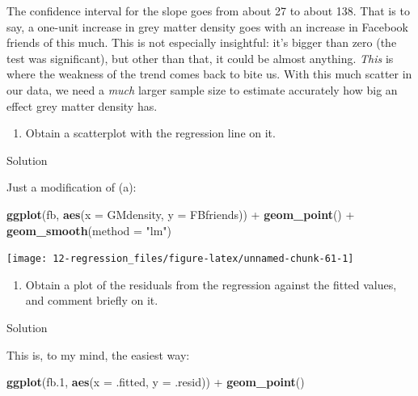 \documentclass[]{tufte-book}
\newenvironment{Shaded}{}{}
\newcommand{\DataTypeTok}[1]{\textcolor[rgb]{0.56,0.13,0.00}{#1}}
\newcommand{\FloatTok}[1]{\textcolor[rgb]{0.25,0.63,0.44}{#1}}
\newcommand{\KeywordTok}[1]{\textcolor[rgb]{0.00,0.44,0.13}{\textbf{#1}}}
\newcommand{\NormalTok}[1]{#1}
\newcommand{\OperatorTok}[1]{\textcolor[rgb]{0.40,0.40,0.40}{#1}}
\newcommand{\StringTok}[1]{\textcolor[rgb]{0.25,0.44,0.63}{#1}}
\providecommand{\tightlist}{%
  \setlength{\itemsep}{0pt}\setlength{\parskip}{0pt}}
\theoremstyle{definition}
\theoremstyle{definition}
\theoremstyle{definition}
\theoremstyle{remark}
\begin{document}
The confidence interval for the slope goes from about 27 to about 138.
That is to say, a one-unit increase in grey matter density goes with an
increase in Facebook friends of this much. This is not especially
insightful: it's bigger than zero (the test was significant), but other
than that, it could be almost anything. \emph{This} is where the
weakness of the trend comes back to bite us. With this much scatter in
our data, we need a \emph{much} larger sample size to estimate
accurately how big an effect grey matter density has.

\begin{enumerate}
\def\labelenumi{(\alph{enumi})}
\setcounter{enumi}{5}
\tightlist
\item
  Obtain a scatterplot with the regression line on it.
\end{enumerate}

Solution

Just a modification of (a):

\begin{Shaded}
\begin{Highlighting}[]
\KeywordTok{ggplot}\NormalTok{(fb, }\KeywordTok{aes}\NormalTok{(}\DataTypeTok{x =}\NormalTok{ GMdensity, }\DataTypeTok{y =}\NormalTok{ FBfriends)) }\OperatorTok{+}\StringTok{ }
\StringTok{    }\KeywordTok{geom_point}\NormalTok{() }\OperatorTok{+}\StringTok{ }\KeywordTok{geom_smooth}\NormalTok{(}\DataTypeTok{method =} \StringTok{"lm"}\NormalTok{)}
\end{Highlighting}
\end{Shaded}

\texttt{[image: 12-regression\_files/figure-latex/unnamed-chunk-61-1]}

\begin{enumerate}
\def\labelenumi{(\alph{enumi})}
\setcounter{enumi}{6}
\tightlist
\item
  Obtain a plot of the residuals from the regression against the fitted
  values, and comment briefly on it.
\end{enumerate}

Solution

This is, to my mind, the easiest way:

\begin{Shaded}
\begin{Highlighting}[]
\KeywordTok{ggplot}\NormalTok{(fb}\FloatTok{.1}\NormalTok{, }\KeywordTok{aes}\NormalTok{(}\DataTypeTok{x =}\NormalTok{ .fitted, }\DataTypeTok{y =}\NormalTok{ .resid)) }\OperatorTok{+}\StringTok{ }\KeywordTok{geom_point}\NormalTok{()}
\end{Highlighting}
\end{Shaded}
\end{document}
